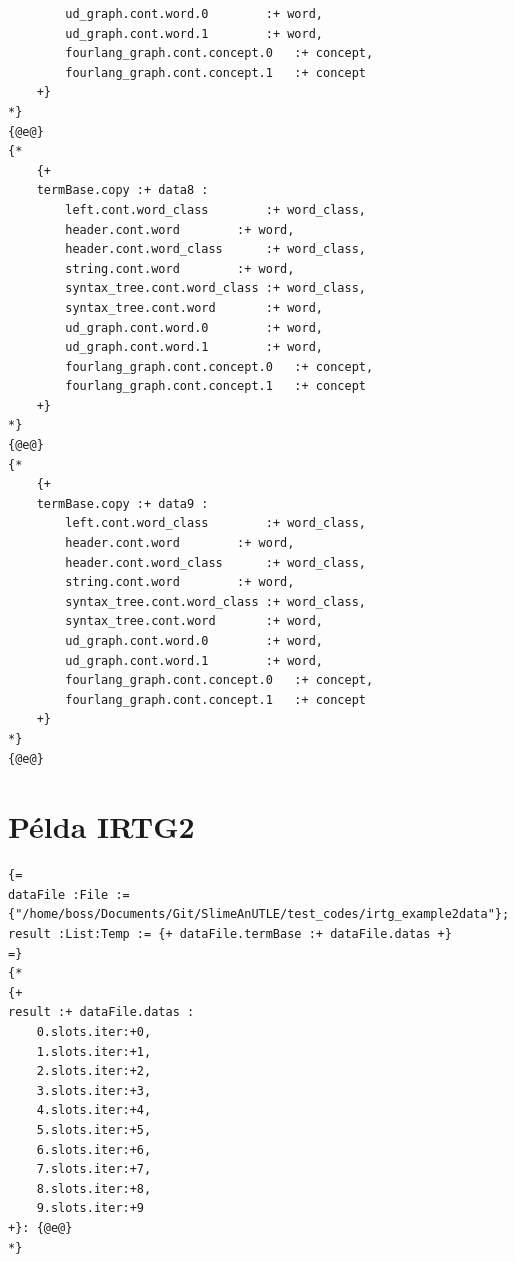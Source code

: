 \begin{verbatim}
		ud_graph.cont.word.0		:+ word,
		ud_graph.cont.word.1		:+ word,
		fourlang_graph.cont.concept.0	:+ concept,
		fourlang_graph.cont.concept.1	:+ concept
	+}
*}
{@e@}
{* 
	{+ 
	termBase.copy :+ data8 : 
		left.cont.word_class 		:+ word_class,
		header.cont.word 		:+ word,
		header.cont.word_class 		:+ word_class,
		string.cont.word	 	:+ word,
		syntax_tree.cont.word_class	:+ word_class,
		syntax_tree.cont.word 		:+ word,
		ud_graph.cont.word.0		:+ word,
		ud_graph.cont.word.1		:+ word,
		fourlang_graph.cont.concept.0	:+ concept,
		fourlang_graph.cont.concept.1	:+ concept
	+}
*}
{@e@}
{* 
	{+ 
	termBase.copy :+ data9 : 
		left.cont.word_class 		:+ word_class,
		header.cont.word 		:+ word,
		header.cont.word_class 		:+ word_class,
		string.cont.word	 	:+ word,
		syntax_tree.cont.word_class	:+ word_class,
		syntax_tree.cont.word 		:+ word,
		ud_graph.cont.word.0		:+ word,
		ud_graph.cont.word.1		:+ word,
		fourlang_graph.cont.concept.0	:+ concept,
		fourlang_graph.cont.concept.1	:+ concept
	+}
*}
{@e@}
\end{verbatim}


\section{Példa IRTG2}
\label{sec:exampleIRTG2}
\begin{verbatim}
{= 
dataFile :File := {"/home/boss/Documents/Git/SlimeAnUTLE/test_codes/irtg_example2data"};
result :List:Temp := {+ dataFile.termBase :+ dataFile.datas +} 
=}
{*
{+ 
result :+ dataFile.datas : 
	0.slots.iter:+0, 
	1.slots.iter:+1, 
	2.slots.iter:+2, 
	3.slots.iter:+3, 
	4.slots.iter:+4, 
	5.slots.iter:+5, 
	6.slots.iter:+6, 
	7.slots.iter:+7, 
	8.slots.iter:+8, 
	9.slots.iter:+9 
+}: {@e@} 
*}

\end{verbatim}

